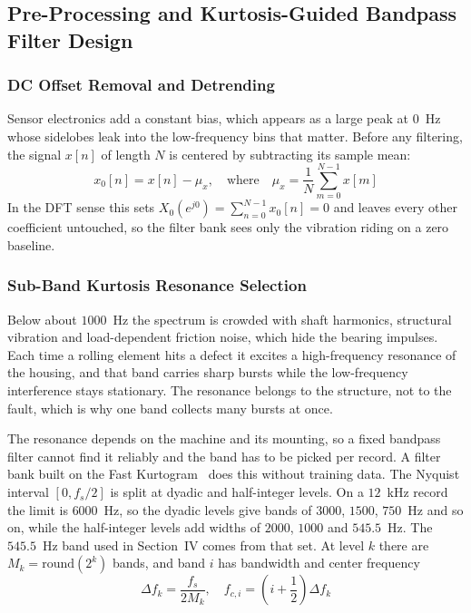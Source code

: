 \subsection{Pre-Processing and Kurtosis-Guided Bandpass Filter Design}

\subsubsection{DC Offset Removal and Detrending}
Sensor electronics add a constant bias, which appears as a large peak at
$0$~Hz whose sidelobes leak into the low-frequency bins that matter. Before any
filtering, the signal $x[n]$ of length $N$ is centered by subtracting its sample
mean:
\begin{equation}
  x_0[n] = x[n] - \mu_x, \quad \text{where} \quad
  \mu_x = \frac{1}{N}\sum_{m=0}^{N-1} x[m]
\end{equation}
In the DFT sense this sets $X_0(e^{j0})=\sum_{n=0}^{N-1}x_0[n]=0$ and leaves
every other coefficient untouched, so the filter bank sees only the vibration
riding on a zero baseline.

\subsubsection{Sub-Band Kurtosis Resonance Selection}
Below about $1000$~Hz the spectrum is crowded with shaft harmonics, structural
vibration and load-dependent friction noise, which hide the bearing impulses.
Each time a rolling element hits a defect it excites a high-frequency resonance
of the housing, and that band carries sharp bursts while the low-frequency
interference stays stationary. The resonance belongs to the structure, not to
the fault, which is why one band collects many bursts at once.

The resonance depends on the machine and its mounting, so a fixed bandpass
filter cannot find it reliably and the band has to be picked per record. A
filter bank built on the Fast Kurtogram~\cite{antoni2007} does this without
training data. The Nyquist interval $[0, f_s/2]$ is split at
dyadic and half-integer levels. On a $12$~kHz record the limit is $6000$~Hz, so
the dyadic levels give bands of $3000$, $1500$, $750$~Hz and so on, while the
half-integer levels add widths of $2000$, $1000$ and $545.5$~Hz. The $545.5$~Hz
band used in Section~IV comes from that set. At level $k$ there are
$M_k = \text{round}(2^k)$ bands, and
band $i$ has bandwidth and center frequency
\begin{equation}
  \Delta f_k = \frac{f_s}{2 M_k}, \quad
  f_{c,i} = \left(i + \frac{1}{2}\right)\Delta f_k
\end{equation}

